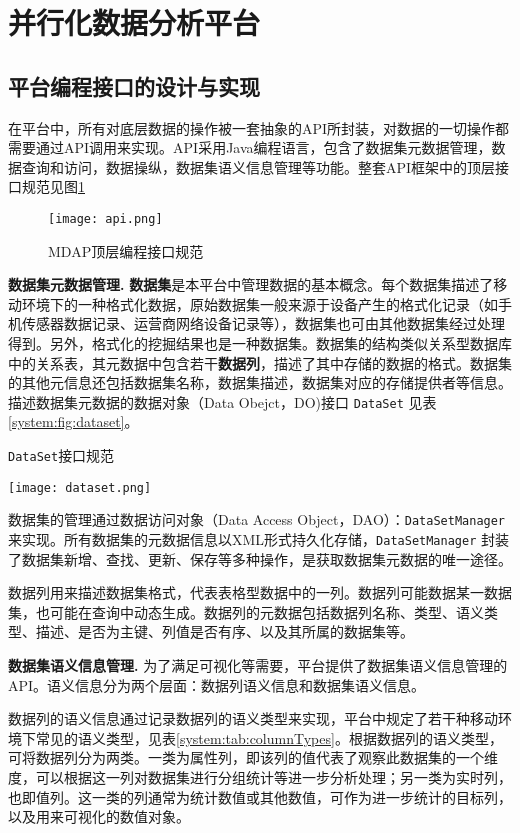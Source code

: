 \section{并行化数据分析平台}
\label{system:sec:mdap}
\subsection{平台编程接口的设计与实现}
\label{system:sec:javaapi}
在平台中，所有对底层数据的操作被一套抽象的API所封装，对数据的一切操作都需要通过API调用来实现。API采用Java编程语言，包含了数据集元数据管理，数据查询和访问，数据操纵，数据集语义信息管理等功能。整套API框架中的顶层接口规范见图\ref{system:fig:javaapi}

\begin{figure}[htbp]
  \centering
    \texttt{[image: api.png]}
  \caption{MDAP顶层编程接口规范}
  \label{system:fig:javaapi}
\end{figure}

\textbf{数据集元数据管理.} 
\textbf{数据集}是本平台中管理数据的基本概念。每个数据集描述了移动环境下的一种格式化数据，原始数据集一般来源于设备产生的格式化记录（如手机传感器数据记录、运营商网络设备记录等），数据集也可由其他数据集经过处理得到。另外，格式化的挖掘结果也是一种数据集。数据集的结构类似关系型数据库中的关系表，其元数据中包含若干\textbf{数据列}，描述了其中存储的数据的格式。数据集的其他元信息还包括数据集名称，数据集描述，数据集对应的存储提供者等信息。描述数据集元数据的数据对象（Data Obejct，DO)接口 \texttt{DataSet} 见表\ref{system:fig:dataset}。

\begin{table}[htbp]
  \centering 
   \caption{\texttt{DataSet}接口规范}
    \texttt{[image: dataset.png]}
  \label{system:fig:dataset}
\end{table}

数据集的管理通过数据访问对象（Data Access Object，DAO）：\texttt{DataSetManager} 来实现。所有数据集的元数据信息以XML形式持久化存储，\texttt{DataSetManager} 封装了数据集新增、查找、更新、保存等多种操作，是获取数据集元数据的唯一途径。

数据列用来描述数据集格式，代表表格型数据中的一列。数据列可能数据某一数据集，也可能在查询中动态生成。数据列的元数据包括数据列名称、类型、语义类型、描述、是否为主键、列值是否有序、以及其所属的数据集等。

\textbf{数据集语义信息管理.} 
为了满足可视化等需要，平台提供了数据集语义信息管理的API。语义信息分为两个层面：数据列语义信息和数据集语义信息。

数据列的语义信息通过记录数据列的语义类型来实现，平台中规定了若干种移动环境下常见的语义类型，见表\ref{system:tab:columnTypes}。根据数据列的语义类型，可将数据列分为两类。一类为属性列，即该列的值代表了观察此数据集的一个维度，可以根据这一列对数据集进行分组统计等进一步分析处理；另一类为实时列，也即值列。这一类的列通常为统计数值或其他数值，可作为进一步统计的目标列，以及用来可视化的数值对象。

